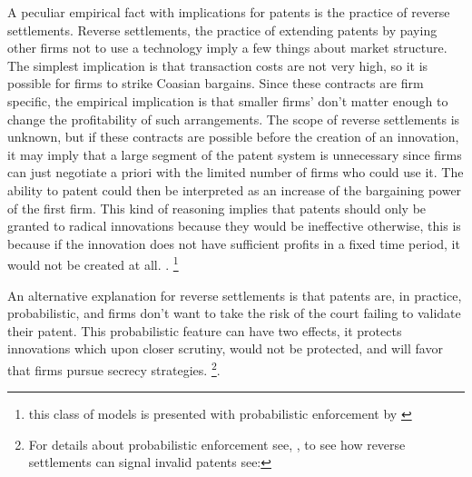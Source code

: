 \documentclass[12pt]{article}
\numberwithin{equation}{section}
\begin{document}
A peculiar empirical fact with implications for patents is the practice of reverse settlements. Reverse settlements, the practice of extending patents by paying other firms not to use a technology imply a few things about market structure. The simplest implication is that transaction costs are not very high, so it is possible for firms to strike Coasian bargains. Since these contracts are firm specific, the empirical implication is that smaller firms' don't matter enough to change the profitability of such arrangements. The scope of reverse settlements is unknown, but if these contracts are possible before the creation of an innovation, it may imply that a large segment of the patent system is unnecessary since firms can just negotiate a priori with the limited number of firms who could use it. The ability to patent could then be interpreted as an increase of the bargaining power of the first firm\cite{green1995division}. This kind of reasoning implies that patents should only be granted to radical innovations because they would be ineffective otherwise, this is because if the innovation does not have sufficient profits in a fixed time period, it would not be created at all. \cite{o1998patentability}. \footnote{this class of models is presented with probabilistic enforcement by \cite{chou2007division} }

An alternative explanation for reverse settlements is that patents are, in practice, probabilistic, and firms don't want to take the risk of the court failing to validate their patent. This probabilistic feature can have two effects, it protects innovations which upon closer scrutiny, would not be protected, and will favor that firms pursue secrecy strategies. \footnote{For details about probabilistic enforcement see, \cite{Lemley2005}, to see how reverse settlements can signal invalid patents see:\cite{Dolin2011}}.


\end{document}
